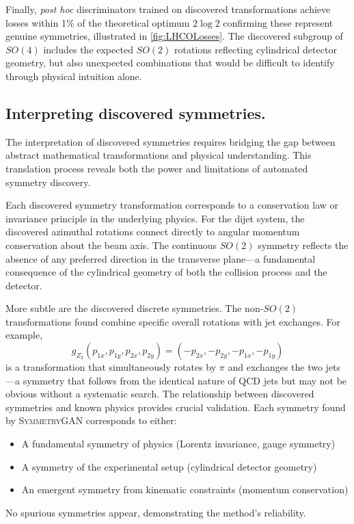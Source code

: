             Finally, \textit{post hoc} discriminators trained on discovered transformations achieve losses within 1\% of the theoretical optimum \(2\log 2\) confirming these represent genuine symmetries, illustrated in \cref{fig:LHCOLosses}.
            The discovered subgroup of \(SO(4)\) includes the expected \(SO(2)\) rotations reflecting cylindrical detector geometry, but also unexpected combinations that would be difficult to identify through physical intuition alone.
            
        \subsection{Interpreting discovered symmetries.}
            The interpretation of discovered symmetries requires bridging the gap between abstract mathematical transformations and physical understanding.
            This translation process reveals both the power and limitations of automated symmetry discovery.
            
            Each discovered symmetry transformation corresponds to a conservation law or invariance principle in the underlying physics.
            For the dijet system, the discovered azimuthal rotations connect directly to angular momentum conservation about the beam axis.
            The continuous \(SO(2)\) symmetry reflects the absence of any preferred direction in the transverse plane---a fundamental consequence of the cylindrical geometry of both the collision process and the detector.
            
            More subtle are the discovered discrete symmetries.
            The non-\(SO(2)\) transformations found combine specific overall rotations with jet exchanges.
            For example,
            \[
                g_{Z_2}(p_{1x}, p_{1y}, p_{2x}, p_{2y}) = (-p_{2x}, -p_{2y}, -p_{1x}, -p_{1y})
            \]
            is a transformation that simultaneously rotates by \(\pi\) and exchanges the two jets---a symmetry that follows from the identical nature of QCD jets but may not be obvious without a systematic search.        
            The relationship between discovered symmetries and known physics provides crucial validation.
            Each symmetry found by \textsc{SymmetryGAN} corresponds to either:
            \begin{itemize}
                \item A fundamental symmetry of physics (Lorentz invariance, gauge symmetry)
                \item A symmetry of the experimental setup (cylindrical detector geometry)
                \item An emergent symmetry from kinematic constraints (momentum conservation)
            \end{itemize}
            No spurious symmetries appear, demonstrating the method's reliability.
            

